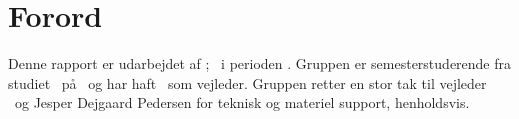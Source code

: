 \chapter*{Forord}
\label{Forord}
Denne rapport er udarbejdet af \groupname; \groupmembers\ i perioden \projectperiod. Gruppen er \semester semesterstuderende fra studiet \studyname\ på \universityname\ og har haft \supervisor\ som vejleder. Gruppen retter en stor tak til vejleder \supervisor\ og Jesper Dejgaard Pedersen for teknisk og materiel support, henholdsvis.
%
